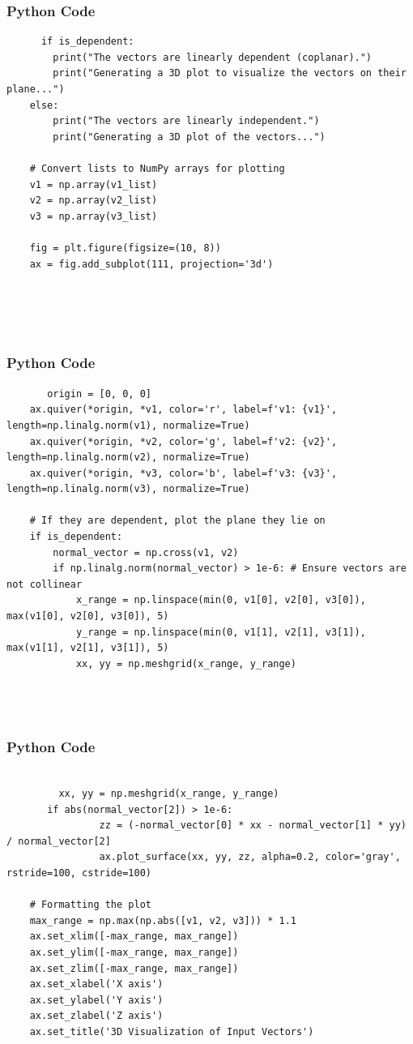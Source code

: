 \documentclass{beamer}
\begin{document}
    \begin{frame}[fragile]
        \frametitle{Python Code}
        \begin{lstlisting}
      if is_dependent:
        print("The vectors are linearly dependent (coplanar).")
        print("Generating a 3D plot to visualize the vectors on their plane...")
    else:
        print("The vectors are linearly independent.")
        print("Generating a 3D plot of the vectors...")

    # Convert lists to NumPy arrays for plotting
    v1 = np.array(v1_list)
    v2 = np.array(v2_list)
    v3 = np.array(v3_list)
    
    fig = plt.figure(figsize=(10, 8))
    ax = fig.add_subplot(111, projection='3d')
    


   
        \end{lstlisting}
    \end{frame}

     \begin{frame}[fragile]
        \frametitle{Python Code}
        \begin{lstlisting}
       origin = [0, 0, 0]
    ax.quiver(*origin, *v1, color='r', label=f'v1: {v1}', length=np.linalg.norm(v1), normalize=True)
    ax.quiver(*origin, *v2, color='g', label=f'v2: {v2}', length=np.linalg.norm(v2), normalize=True)
    ax.quiver(*origin, *v3, color='b', label=f'v3: {v3}', length=np.linalg.norm(v3), normalize=True)
    
    # If they are dependent, plot the plane they lie on
    if is_dependent:
        normal_vector = np.cross(v1, v2)
        if np.linalg.norm(normal_vector) > 1e-6: # Ensure vectors are not collinear
            x_range = np.linspace(min(0, v1[0], v2[0], v3[0]), max(v1[0], v2[0], v3[0]), 5)
            y_range = np.linspace(min(0, v1[1], v2[1], v3[1]), max(v1[1], v2[1], v3[1]), 5)
            xx, yy = np.meshgrid(x_range, y_range)
            
           
    
        \end{lstlisting}
    \end{frame}

    \begin{frame}[fragile]
        \frametitle{Python Code}
        \begin{lstlisting}

         xx, yy = np.meshgrid(x_range, y_range)
       if abs(normal_vector[2]) > 1e-6:
                zz = (-normal_vector[0] * xx - normal_vector[1] * yy) / normal_vector[2]
                ax.plot_surface(xx, yy, zz, alpha=0.2, color='gray', rstride=100, cstride=100)

    # Formatting the plot
    max_range = np.max(np.abs([v1, v2, v3])) * 1.1
    ax.set_xlim([-max_range, max_range])
    ax.set_ylim([-max_range, max_range])
    ax.set_zlim([-max_range, max_range])
    ax.set_xlabel('X axis')
    ax.set_ylabel('Y axis')
    ax.set_zlabel('Z axis')
    ax.set_title('3D Visualization of Input Vectors')
  
    
        \end{lstlisting}
    \end{frame}
\end{document}
